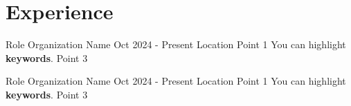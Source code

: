 \section{Experience}
\resumeSubHeadingListStart

\resumeExp
{Role}
{Organization Name}
{Oct 2024 - Present}
{Location}
\resumeItemListStart
\point Point 1
\point You can highlight \textbf{keywords}.
\point Point 3
\resumeItemListEnd

\resumeExp
{Role}
{Organization Name}
{Oct 2024 - Present}
{Location}
\resumeItemListStart
\point Point 1
\point You can highlight \textbf{keywords}.
\point Point 3
\resumeItemListEnd



\resumeSubHeadingListEnd
\vspace{-7.5mm}